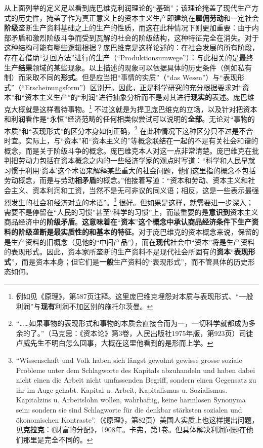 \documentclass[fontset=fandol, a4paper, 12pt, openright]{ctexbook}
\begin{document}
从上面列举的定义足以看到庞巴维克利润理论的“基础”；该理论掩盖了现代生产方式的历史性，掩盖了作为真正意义上的资本主义生产即建筑在\textbf{雇佣劳动}和一定社会\textbf{阶级}垄断生产资料基础之上的生产的性质，而这在此种情况下则更加重要：由于内部矛盾和激烈阶级斗争而受到瓦解的社会的阶级结构，这种特征完全在消失。对于这种结构可能有哪些逻辑根据？庞巴维克是这样论述的：在社会发展的所有阶段，存在着借助“迂回方法”进行的生产（“Produktionsumwege”）：与此相关的是最终生产\textbf{结果}领域的某些现象。以上描述的现象可以依据具体的历史条件（例如私有制）而采取不同的\textbf{形式}。但是应当把“事情的实质”（“das Wesen”）与“表现形式”（“Erscheinungsform”）区别开。因此，正是科学研究的充分根据要求对“资本”和“资本主义生产”的“利润”进行抽象分析而不是对其进行\textbf{现实的}表述。庞巴维克大概就是这样看待事物。\footnote{例如见《原理》，第587页注释。这里庞巴维克埋怨对本质与表现形式、“一般利润”与\textbf{现有}利润不加区别的施托尔茨曼。} 不过这就是为捍卫庞巴维克的立场，以及针对把资本和利润看作是“永恒”经济范畴的任何相类似尝试可以说明的\textbf{全部}。无论对“事物的本质”和“表现形式”的区分本身如何正确，\footnote{“……如果事物的表现形式和事物的本质会直接合而为一，一切科学就都成为多余的了。”（马克思：《资本论》第3卷，人民出版社1975年版，第923页）司徒卢威先生不明白怎么回事，大概在这里他看到的是形而上学。} 在此种情况下这种区分只不过是不合时宜。实际上，与“资本”和“资本主义的”等概念联结在一起的不是有关社会和谐的概念，而是关于阶级斗争的概念。庞巴维克本人对这一点非常清楚。庞巴维克在批判把劳动力包括在资本概念之内的一些经济学家的观点时写道：“科学和人民早就习惯于利用‘资本’这个术语来解释某些重大的社会问题，他们这里指的概念不包括劳动概念，而是与劳动\textbf{相矛盾}的概念。”他接着写道：“资本和劳动、资本主义和社会主义、资本利润和工资，当然不是无可非议的同义语；相反，这是一些表示最强烈发生的社会和经济对立的术语”。\footnote{``Wissenschaft und Volk haben sich l\"{a}ngst gewohnt gewisse grosse soziale Probleme unter dem Schlagworte des Kapitals abzuhandeln und haben dabei nicht einen die Arbeit nicht umfassenden Begriff, sondern einen Gegensatz zu ihr im Auge gehabt. Kapital u. Arbeit, Kapitalismus u. Sozialismus. Kapitalzins u. Arbeitslohn wollen, wahrhaftig, keine harmlosen Synonyma sein: sondern sie sind Schlagworte f\"{u}r die denkbar st\"{a}rksten sozialen und \"{o}konomischen Kontraste''.（《原理》，第82页）美国人实质上也这样提出问题，见\textbf{克拉克}：《财富的分配》，1908年。卡弗，第1卷。但具体解决利润问题在他们那里是完全不同的。} 很好。但如果是这样，就需要进一步深入；需要不是停留在“人民的习惯”甚至“科学的习惯”上，而最重要的是\textbf{意识到}资本主义商品经济中的\textbf{阶级矛盾}。\textbf{这意味着在}“\textbf{资本}”\textbf{这个概念中承认商品经济条件下生产资料的阶级垄断是最实质性的和基本的特征}。对于庞巴维克的资本概念来说，保留的是生产资料的旧概念（见他的“中间产品”），而在\textbf{现代}社会中“资本”将是生产资料的表现形式。因此，资本家所垄断的生产资料不是现代社会所固有的\textbf{资本}“\textbf{表现形式}”，而是资本本身；但它们是\textbf{一般}生产资料的“表现形式”，而不管具体的历史形态如何。
\end{document}
